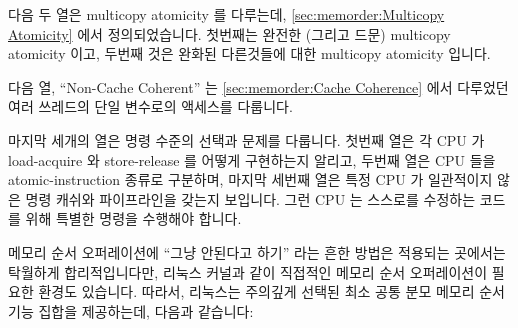 다음 두 열은 multicopy atomicity 를 다루는데,
\cref{sec:memorder:Multicopy Atomicity} 에서 정의되었습니다.
첫번째는 완전한 (그리고 드문) multicopy atomicity 이고, 두번째 것은 완화된
다른것들에 대한 multicopy atomicity 입니다.

다음 열, ``Non-Cache Coherent'' 는
\cref{sec:memorder:Cache Coherence} 에서 다루었던 여러 쓰레드의 단일 변수로의
액세스를 다룹니다.

마지막 세개의 열은 명령 수준의 선택과 문제를 다룹니다.
첫번째 열은 각 CPU 가 load-acquire 와 store-release 를 어떻게 구현하는지
알리고, 두번째 열은 CPU 들을 atomic-instruction 종류로 구분하며, 마지막 세번째
열은 특정 CPU 가 일관적이지 않은 명령 캐쉬와 파이프라인을 갖는지 보입니다.
그런 CPU 는 스스로를 수정하는 코드를 위해 특별한 명령을 수행해야 합니다.

메모리 순서 오퍼레이션에 ``그냥 안된다고 하기'' 라는 흔한 방법은 적용되는
곳에서는 탁월하게 합리적입니다만, 리눅스 커널과 같이 직접적인 메모리 순서
오퍼레이션이 필요한 환경도 있습니다.
따라서, 리눅스는 주의깊게 선택된 최소 공통 분모 메모리 순서 기능 집합을
제공하는데, 다음과 같습니다:

\iffalse

